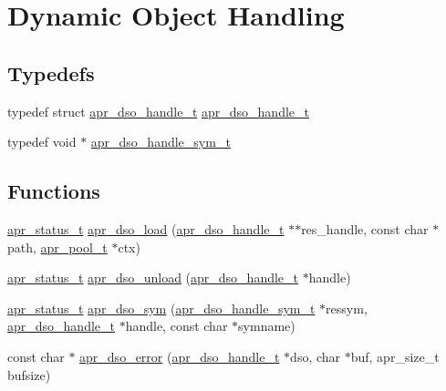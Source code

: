 \hypertarget{group__apr__dso}{}\section{Dynamic Object Handling}
\label{group__apr__dso}
\subsection*{Typedefs}
\begin{DoxyCompactItemize}
\item 
typedef struct \hyperlink{group__apr__dso_ga85e7e28490d026aeed78bd78e9933472}{apr\+\_\+dso\+\_\+handle\+\_\+t} \hyperlink{group__apr__dso_ga85e7e28490d026aeed78bd78e9933472}{apr\+\_\+dso\+\_\+handle\+\_\+t}
\item 
typedef void $\ast$ \hyperlink{group__apr__dso_gaf1aa0a039e8003586cfdfbc4ac57e775}{apr\+\_\+dso\+\_\+handle\+\_\+sym\+\_\+t}
\end{DoxyCompactItemize}
\subsection*{Functions}
\begin{DoxyCompactItemize}
\item 
\hyperlink{group__apr__errno_gaf76ee4543247e9fb3f3546203e590a6c}{apr\+\_\+status\+\_\+t} \hyperlink{group__apr__dso_gaedc8609c2bb76e5c43f2df2281a9d8b6}{apr\+\_\+dso\+\_\+load} (\hyperlink{group__apr__dso_ga85e7e28490d026aeed78bd78e9933472}{apr\+\_\+dso\+\_\+handle\+\_\+t} $\ast$$\ast$res\+\_\+handle, const char $\ast$path, \hyperlink{group__apr__pools_gaf137f28edcf9a086cd6bc36c20d7cdfb}{apr\+\_\+pool\+\_\+t} $\ast$ctx)
\item 
\hyperlink{group__apr__errno_gaf76ee4543247e9fb3f3546203e590a6c}{apr\+\_\+status\+\_\+t} \hyperlink{group__apr__dso_ga4c7b1b4e98a5d23c56182ece047fbb7b}{apr\+\_\+dso\+\_\+unload} (\hyperlink{group__apr__dso_ga85e7e28490d026aeed78bd78e9933472}{apr\+\_\+dso\+\_\+handle\+\_\+t} $\ast$handle)
\item 
\hyperlink{group__apr__errno_gaf76ee4543247e9fb3f3546203e590a6c}{apr\+\_\+status\+\_\+t} \hyperlink{group__apr__dso_gae84cd7041976787d73a9558e3393b97c}{apr\+\_\+dso\+\_\+sym} (\hyperlink{group__apr__dso_gaf1aa0a039e8003586cfdfbc4ac57e775}{apr\+\_\+dso\+\_\+handle\+\_\+sym\+\_\+t} $\ast$ressym, \hyperlink{group__apr__dso_ga85e7e28490d026aeed78bd78e9933472}{apr\+\_\+dso\+\_\+handle\+\_\+t} $\ast$handle, const char $\ast$symname)
\item 
const char $\ast$ \hyperlink{group__apr__dso_gafa34fc75e1e9b8856385d3b18cfac05c}{apr\+\_\+dso\+\_\+error} (\hyperlink{group__apr__dso_ga85e7e28490d026aeed78bd78e9933472}{apr\+\_\+dso\+\_\+handle\+\_\+t} $\ast$dso, char $\ast$buf, apr\+\_\+size\+\_\+t bufsize)
\end{DoxyCompactItemize}


